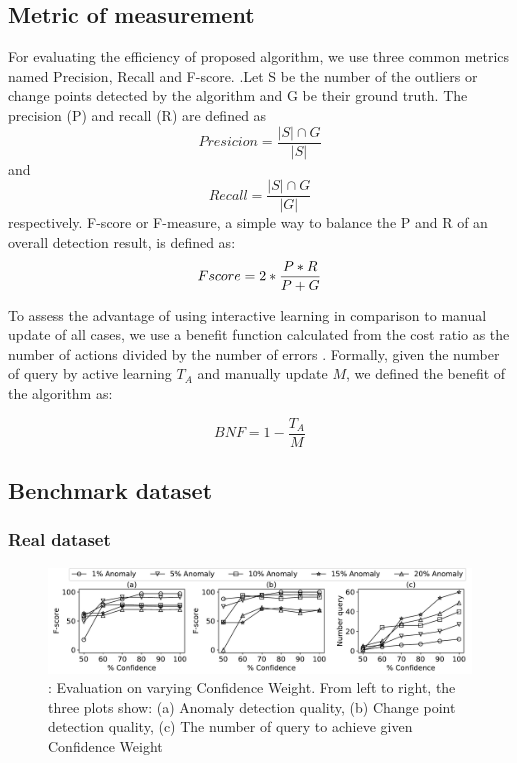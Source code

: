 \subsection{Metric of measurement}
For evaluating the efficiency of proposed algorithm, we use three common metrics named Precision, Recall and F-score. .Let S be the number of the outliers or change points detected by the algorithm and G be their ground truth. The precision (P) and recall (R) are defined as
\begin{equation}\label{Precision}
Presicion = \frac{|{S}|\cap{G}}{|{S}|}
\end{equation}
and
\begin{equation}\label{Recall}
Recall = \frac{|{S}|\cap{G}}{|{G}|}
\end{equation}
respectively. F-score or F-measure, a simple way to balance the P and R of an overall detection result, is defined as: 
\begin{equation}\label{F-score}
F\-score = 2 * \frac{P * R}{P + G}
\end{equation}

To assess the advantage of using interactive learning in comparison to manual update of all cases, we use a benefit function calculated from the cost ratio as the number of actions divided by the number of errors \cite{he2016interactive}. Formally, given the number of query by active learning $ T_A $ and manually update $ M $, we defined the benefit of the algorithm as: 

\begin{equation}\label{func: benefit_function}
BNF = 1 - \frac{T_A}{M}
\end{equation}

\subsection{Benchmark dataset}
\subsubsection{Real dataset}

\begin{figure}[h]
	\centering
	\includegraphics[width=\textwidth,height=\textheight,keepaspectratio]{Part3/Chapter7/figures/new_changeALpercentage_with1CP.pdf}
	\caption{ : Evaluation on varying Confidence Weight. From left to right, the three plots show: (a) Anomaly detection quality, (b) Change point detection quality, (c) The number of query to achieve given Confidence Weight}
	\label{fig: confident_1CP_compare}
\end{figure}

